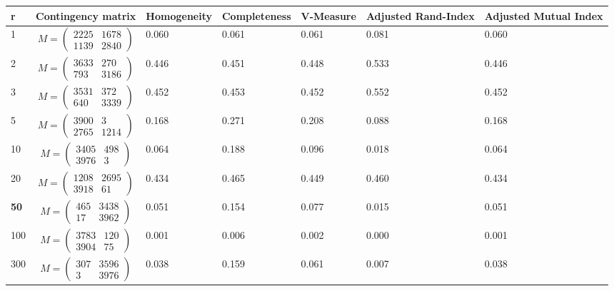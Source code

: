 \documentclass{article}
\begin{document}
\begin{center}
	\begin{tabular}{ | m{1cm} | m{3cm}| m{2cm} | m{2cm} | m{2cm} | m{2cm} | m{2cm} | } 
		\hline
		r& Contingency matrix & Homogeneity& Completeness& V-Measure& Adjusted Rand-Index& Adjusted Mutual Index \\ 
		\hline
		1 & $$ M = \left( \begin{smallmatrix} 2225&1678\\ 1139&2840 \end{smallmatrix} \right) $$ & 0.060& 0.061& 0.061& 0.081& 0.060 \\ 
		\hline
		2 & $$ M = \left( \begin{smallmatrix} 3633&270\\ 793&3186 \end{smallmatrix} \right) $$ & 0.446& 0.451& 0.448& 0.533& 0.446 \\ 
		\hline
		3 & $$ M = \left( \begin{smallmatrix} 3531&372\\ 640&3339 \end{smallmatrix} \right) $$ & 0.452& 0.453& 0.452& 0.552& 0.452\\
		\hline
		5& $$ M = \left( \begin{smallmatrix} 3900&3\\ 2765&1214 \end{smallmatrix} \right) $$ & 0.168& 0.271& 0.208& 0.088& 0.168\\
		\hline
		10 & $$ M = \left( \begin{smallmatrix} 3405&498\\ 3976&3 \end{smallmatrix} \right) $$ & 0.064& 0.188& 0.096& 0.018& 0.064\\
		\hline
		20 & $$ M = \left( \begin{smallmatrix} 1208&2695\\ 3918&61 \end{smallmatrix} \right) $$ & 0.434& 0.465& 0.449& 0.460& 0.434\\
		\hline
		\textbf{50} & $$ M = \left( \begin{smallmatrix} 465&3438\\ 17&3962 \end{smallmatrix} \right) $$ & 0.051& 0.154& 0.077& 0.015& 0.051\\
		\hline
		100 & $$ M = \left( \begin{smallmatrix} 3783&120\\ 3904&75 \end{smallmatrix} \right) $$ & 0.001& 0.006& 0.002& 0.000& 0.001\\
		\hline
		300 & $$ M = \left( \begin{smallmatrix} 307&3596\\ 3&3976 \end{smallmatrix} \right) $$ & 0.038& 0.159& 0.061& 0.007& 0.038\\
		\hline
	\end{tabular}
\end{center}
\vspace{5cm}
\end{document}
